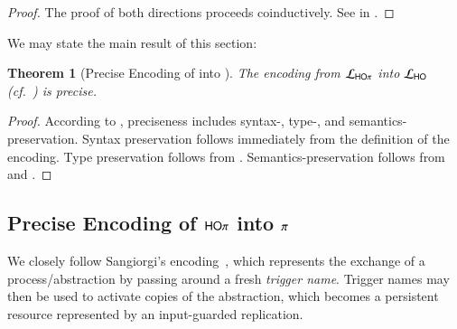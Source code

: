 \documentclass[preprint,11pt]{elsarticle}
\newtheorem{theorem}{Theorem}[section]
\begin{document}
{\begin{proof}
The proof of both directions proceeds coinductively.
See  in .
\end{proof}


We may state the main result of this section: %

\begin{theorem}[Precise Encoding of \HOp into \HO]
\label{f:enc:hopitoho}
The encoding from $\mathcal{L}_{\mathsf{HO}\pi}$ into $\mathcal{L}_{\mathsf{HO}}$ (cf.~)
is precise. 
\end{theorem}

\begin{proof}
According to , preciseness includes syntax-, type-, and semantics-preservation. 
Syntax preservation follows immediately from the definition of the encoding. 
Type preservation follows from .
Semantics-preservation follows from 	 and .
\end{proof}

\subsection{Precise Encoding of $\mathsf{HO}\pi$ into $\pi$}
\label{subsec:HOp_to_sessp}
We closely follow Sangiorgi's encoding~\cite{San92,SaWabook}, which represents 
the exchange of a process/abstraction by passing around a fresh \emph{trigger name}. 
Trigger names may then be used to activate copies of the abstraction, which becomes a persistent resource represented by an input-guarded replication.

}
\end{document}
